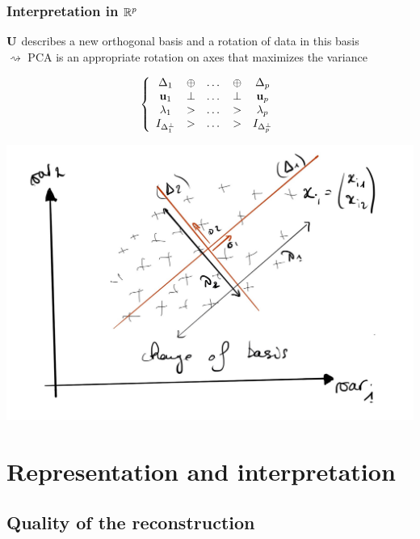 \documentclass{beamer}\usepackage[]{graphicx}\usepackage[]{color}
\begin{document}
\begin{frame}
  \frametitle{Interpretation in $\mathbb{R}^p$}
    
  $\mathbf{U}$ describes a new orthogonal basis and a rotation of data in this basis\\
  $\rightsquigarrow$ PCA is an appropriate rotation on axes that maximizes the variance

  \begin{equation*}
    \left\{\begin{array}{ccccc}
      \Delta_1 & \oplus & \dots & \oplus & \Delta_p \\
      \mathbf{u}_1 & \bot & \dots & \bot & \mathbf{u}_p \\
      \lambda_1 & > & \dots & > & \lambda_p \\
      I_{\Delta_1^\bot} & > & \dots & > & I_{\Delta_p^\bot} \\
    \end{array}\right.
  \end{equation*}

  \includegraphics[width=.6\textwidth]{rotation}
\end{frame}


\section{Representation and interpretation}

\subsection{Quality of the reconstruction}
\end{document}
